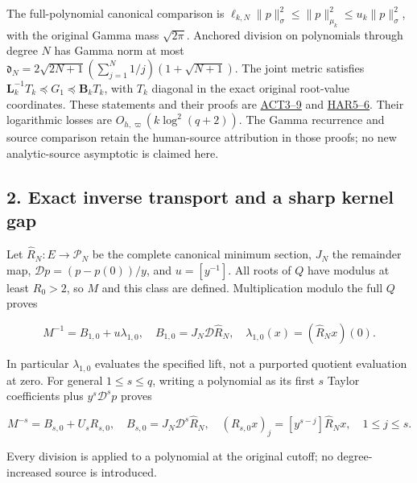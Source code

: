 \documentclass[11pt]{article}
\begin{document}
The full-polynomial canonical comparison is \(\ell_{k,N}\|p\|_\sigma^2\le\|p\|_{\mu_k}^2\le u_k\|p\|_\sigma^2\), with the original Gamma mass \(\sqrt{2\pi}\). Anchored division on polynomials through degree \(N\) has Gamma norm at most \(\mathfrak d_N=2\sqrt{2N+1}(\sum_{j=1}^N1/j)(1+\sqrt{N+1})\). The joint metric satisfies \(\mathbf L_k^{-1}T_k\preceq G_1\preceq\mathbf B_kT_k\), with \(T_k\) diagonal in the exact original root-value coordinates. These statements and their proofs are \href{https://github.com/KokunoYumeto/zeta-function-research-reader/blob/360d3c1d798da434966d35f7e407fc59c14f234b/workbenches/splitzero-tandem/continuations/20260921-critical-inverse-activation/ACTION_PROOFS.md\#L81}{ACT3--9} and \href{https://github.com/KokunoYumeto/zeta-function-research-reader/blob/360d3c1d798da434966d35f7e407fc59c14f234b/workbenches/splitzero-tandem/continuations/20260921-critical-inverse-activation/HARMONIC_PROOFS.md\#L60}{HAR5--6}. Their logarithmic losses are \(O_{h,\varpi}(k\log^2(q+2))\). The Gamma recurrence and source comparison retain the human-source attribution in those proofs; no new analytic-source asymptotic is claimed here.

\subsection{2. Exact inverse transport and a sharp kernel gap}\label{exact-inverse-transport-and-a-sharp-kernel-gap}

Let \(\widehat R_N:E\to\mathcal P_N\) be the complete canonical minimum section, \(J_N\) the remainder map, \(\mathscr Dp=(p-p(0))/y\), and \(u=[y^{-1}]\). All roots of \(Q\) have modulus at least \(R_0>2\), so \(M\) and this class are defined. Multiplication modulo the full \(Q\) proves

\[
M^{-1}=B_{1,0}+u\lambda_{1,0},\quad
B_{1,0}=J_N\mathscr D\widehat R_N,
\quad\lambda_{1,0}(x)=(\widehat R_Nx)(0).
\tag{KG6}
\]

In particular \(\lambda_{1,0}\) evaluates the specified lift, not a purported quotient evaluation at zero. For general \(1\le s\le q\), writing a polynomial as its first \(s\) Taylor coefficients plus \(y^s\mathscr D^sp\) proves

\[
M^{-s}=B_{s,0}+U_sR_{s,0},\quad
B_{s,0}=J_N\mathscr D^s\widehat R_N,\quad
(R_{s,0}x)_j=[y^{s-j}]\widehat R_Nx,\quad1\le j\le s.
\tag{KG7}
\]

Every division is applied to a polynomial at the original cutoff; no degree-increased source is introduced.
\end{document}
